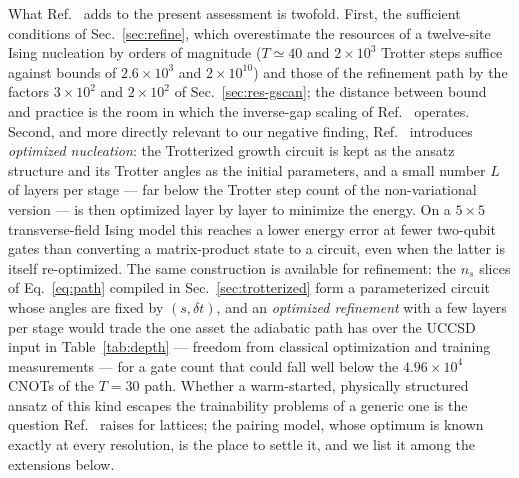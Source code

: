 \documentclass[
  aps,            %
  prc,            %
  reprint,        %
  superscriptaddress,
  floatfix,
  nofootinbib
]{revtex4-2}
\begin{document}
What Ref.~\cite{Sadia2026} adds to the present assessment is twofold.  First,
the sufficient conditions of Sec.~\ref{sec:refine}, which overestimate the
resources of a twelve-site Ising nucleation by orders of magnitude
($T\simeq40$ and $2\times10^{3}$ Trotter steps suffice against bounds of
$2.6\times10^{3}$ and $2\times10^{10}$) and those of the refinement path by
the factors $3\times10^{2}$ and $2\times10^{2}$ of Sec.~\ref{sec:res-gscan}; the
distance between bound and practice is the room in which the inverse-gap
scaling of Ref.~\cite{Bogner2026} operates.  Second, and more directly
relevant to our negative finding, Ref.~\cite{Sadia2026} introduces
\emph{optimized nucleation}: the Trotterized growth circuit is kept as the
ansatz structure and its Trotter angles as the initial parameters, and a
small number $L$ of layers per stage --- far below the Trotter step count of
the non-variational version --- is then optimized layer by layer to minimize
the energy.  On a $5\times5$ transverse-field Ising model this reaches a
lower energy error at fewer two-qubit gates than converting a matrix-product
state to a circuit, even when the latter is itself re-optimized.  The same
construction is available for refinement: the $n_s$ slices of
Eq.~\eqref{eq:path} compiled in Sec.~\ref{sec:trotterized} form a
parameterized circuit whose angles are fixed by $(s,\delta t)$, and an
\emph{optimized refinement} with a few layers per stage would trade the one
asset the adiabatic path has over the UCCSD input in Table~\ref{tab:depth}
--- freedom from classical optimization and training measurements --- for a
gate count that could fall well below the $4.96\times10^{4}$ CNOTs of the
$T=30$ path.  Whether a warm-started, physically structured ansatz of this
kind escapes the trainability problems of a generic one is the question
Ref.~\cite{Sadia2026} raises for lattices; the pairing model, whose optimum
is known exactly at every resolution, is the place to settle it, and we list
it among the extensions below.
\end{document}
